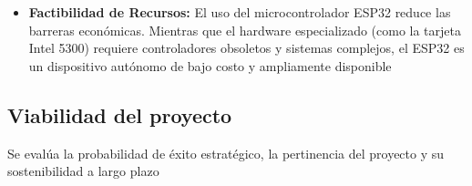 \documentclass[12pt, a4paper]{article}
\begin{document}
\begin{itemize}
\item \textbf{Factibilidad de Recursos:}
El uso del microcontrolador ESP32 reduce las barreras económicas. Mientras que el hardware especializado (como la tarjeta Intel 5300) requiere controladores obsoletos \cite{kim2026csi}\cite{cominelli2023exposingcsisystematicinvestigation} y sistemas complejos, el ESP32 es un dispositivo autónomo de bajo costo y ampliamente disponible \cite{tong2024human}

\end{itemize}

\subsection{Viabilidad del proyecto}
Se evalúa la probabilidad de éxito estratégico, la pertinencia del proyecto y su sostenibilidad a largo plazo
\end{document}
